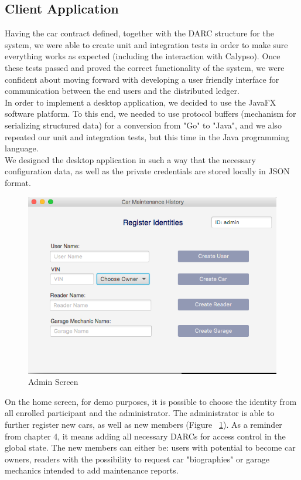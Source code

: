\subsection{Client Application}
Having the car contract defined, together with the DARC structure for the system, we were able to create unit and integration tests in order to make sure everything works as expected (including the interaction with Calypso).
\newline
Once these tests passed and proved the correct functionality of the system, we were confident about moving forward with developing a user friendly interface for communication between the end users and the distributed ledger.
\\
\newline
In order to implement a desktop application, we decided to use the JavaFX software platform. To this end, we needed to use protocol buffers (mechanism for serializing structured data\cite{Protocol Buffers}) for a conversion from "Go" to "Java", and we also repeated our unit and integration tests, but this time in the Java programming language.\\
\newline
We designed the desktop application in such a way that the necessary configuration data, as well as the private credentials are stored locally in JSON format.
\begin{figure}[H]
    \centering
    \includegraphics[width=1\textwidth]{Figures/DesktopApp/adminScreen.png}
    \caption{Admin Screen}
    \label{Admin Screen}
\end{figure}
\noindent
On the home screen, for demo purposes, it is possible to choose the identity from all enrolled participant and the administrator. The administrator is able to further register new cars, as well as new members (Figure ~\ref{Admin Screen}). As a reminder from chapter 4, it means adding all necessary DARCs for access control in the global state. The new members can either be: users with potential to become car owners, readers with the possibility to request car "biographies" or garage mechanics intended to add maintenance reports.\\
